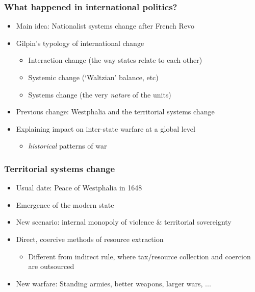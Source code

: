 \documentclass[aspectratio=43]{beamer}
\begin{document}
\begin{frame}
\frametitle{What happened in international politics?}
\centering

\begin{itemize}
  \item Main idea: Nationalist systems change after French Revo
  \item Gilpin's typology of international change
  \begin{itemize}
    \item Interaction change (the way states relate to each other)
    \item Systemic change (`Waltzian' balance, etc)
    \item Systems change (the very \textit{nature} of the units)
  \end{itemize}
  \item Previous change: Westphalia and the territorial systems change
  \item Explaining impact on inter-state warfare at a global level
  \begin{itemize}
    \item \textit{historical} patterns of war
  \end{itemize}
 \end{itemize}

\end{frame}

\begin{frame}
\frametitle{Territorial systems change}
\centering

\begin{itemize}
  \item Usual date: Peace of Westphalia in 1648
  \item Emergence of the modern state
  \item New scenario: internal monopoly of violence \& territorial sovereignty
  \item Direct, coercive methods of resource extraction
  \begin{itemize}
    \item Different from indirect rule, where tax/resource collection and coercion are outsourced
  \end{itemize}
  \item New warfare: Standing armies, better weapons, larger wars, ...
\end{itemize}

\end{frame}
\end{document}
